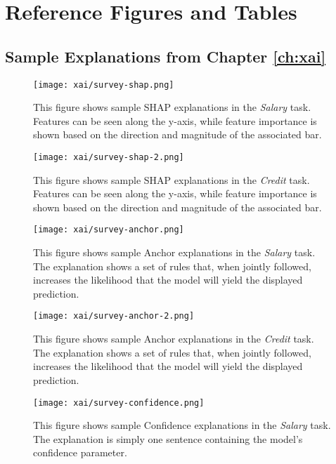\chapter{\label{app:figures}Reference Figures and Tables}

\minitoc

\section{Sample Explanations from Chapter \ref{ch:xai}}\label{app:xaifigures}

\begin{figure}[!htbp]
    \centering
    \texttt{[image: xai/survey-shap.png]}
    \caption{This figure shows sample SHAP explanations in the \emph{Salary} task. Features can be seen along the y-axis, while feature importance is shown based on the direction and magnitude of the associated bar.}
    \label{fig:shapsalaryfull}
\end{figure}

\begin{figure}[!hbtp]
    \centering
    \texttt{[image: xai/survey-shap-2.png]}
    \caption{This figure shows sample SHAP explanations in the \emph{Credit} task. Features can be seen along the y-axis, while feature importance is shown based on the direction and magnitude of the associated bar.}
    \label{fig:shapcreditfull}
\end{figure}

\begin{figure}[!hbtp]
    \centering
    \texttt{[image: xai/survey-anchor.png]}
    \caption{This figure shows sample Anchor explanations in the \emph{Salary} task. The explanation shows a set of rules that, when jointly followed, increases the likelihood that the model will yield the displayed prediction.}
    \label{fig:anchorsalaryfull}
\end{figure}

\begin{figure}[!hbtp]
    \centering
    \texttt{[image: xai/survey-anchor-2.png]}
    \caption{This figure shows sample Anchor explanations in the \emph{Credit} task. The explanation shows a set of rules that, when jointly followed, increases the likelihood that the model will yield the displayed prediction.}
    \label{fig:anchorcreditfull}
\end{figure}

\begin{figure}[!hbtp]
    \centering
    \texttt{[image: xai/survey-confidence.png]}
    \caption{This figure shows sample Confidence explanations in the \emph{Salary} task. The explanation is simply one sentence containing the model's confidence parameter.}
    \label{fig:confidencesalaryfull}
\end{figure}

